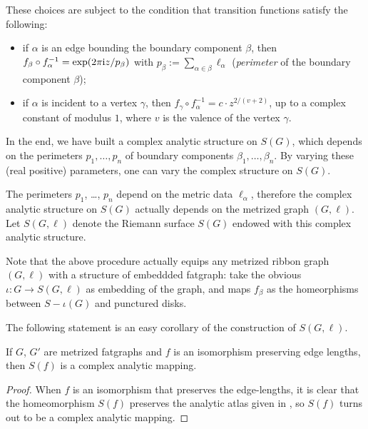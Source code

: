 These choices are subject to the condition that transition functions
satisfy the following:
\begin{itemize}
\item if $\alpha$ is an edge bounding the boundary component $\beta$, then $f_\beta
  \circ f_\alpha^{-1} = \exp (2\pi\mathrm{i} z / p_\beta)$ with $p_\beta := \sum_{\alpha \in \beta} \ell_\alpha$
  (\emph{perimeter} of the boundary component $\beta$);
\item if $\alpha$ is incident to a vertex $\gamma$, then $f_\gamma \circ f_\alpha^{-1} =
  c \cdot z^{2/(v+2)}$, up to a complex constant of modulus $1$, where
  $v$ is the valence of the vertex $\gamma$.
\end{itemize}

In the end, we have built a complex analytic structure on $S(G)$,
which depends on the perimeters $p_1, \ldots, p_n$ of boundary components
$\beta_1, \ldots, \beta_n$. By varying these (real positive) parameters, one can
vary the complex structure on $S(G)$.

The perimeters $p_1$, \ldots, $p_n$ depend on the metric data $\ell_\alpha$,
therefore the complex analytic structure on $S(G)$ actually depends on
the metrized graph $(G, \ell)$.  Let $S(G, \ell)$ denote the Riemann
surface $S(G)$ endowed with this complex analytic structure.

\begin{remark}
  Note that the above procedure actually equips any metrized ribbon
  graph $(G, \ell)$ with a structure of embeddded fatgraph: take the
  obvious $\iota:G \to S(G, \ell)$ as embedding of the graph, and maps $f_\beta$ as
  the homeorphisms between $S - \iota(G)$ and punctured disks.
\end{remark}

The following statement is an easy corollary of the construction of
$S(G, \ell)$.
\begin{lemma}
  \label{lemma:rg-morphism}
  If $G$, $G'$ are metrized fatgraphs and $f$ is an isomorphism
  preserving edge lengths, then $S(f)$ is a complex analytic mapping.
\end{lemma}
\begin{proof}
  When $f$ is an isomorphism that preserves the edge-lengths, it is
  clear that the homeomorphism $S(f)$ preserves the analytic atlas
  given in , so $S(f)$ turns out to be a complex
  analytic mapping.
\end{proof}


